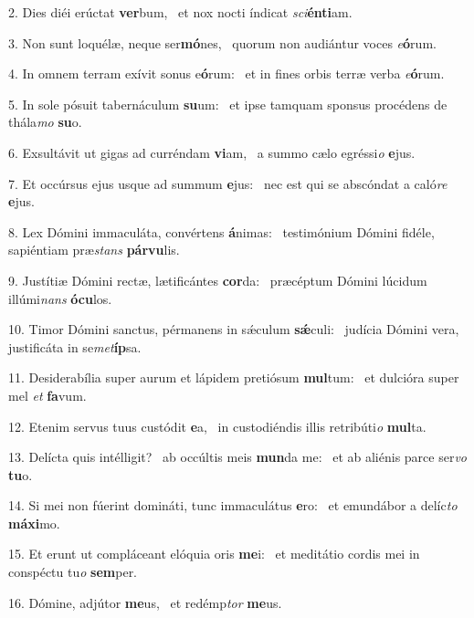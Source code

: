 2. Dies diéi erúctat \textbf{ver}bum, \ast\  et nox nocti índicat \textit{sci}\textbf{én}\textbf{ti}am.\

3. Non sunt loquélæ, neque ser\textbf{mó}nes, \ast\  quorum non audiántur voces \textit{e}\textbf{ó}rum.\

4. In omnem terram exívit sonus e\textbf{ó}rum: \ast\  et in fines orbis terræ verba \textit{e}\textbf{ó}rum.\

5. In sole pósuit tabernáculum \textbf{su}um: \ast\  et ipse tamquam sponsus procédens de thála\textit{mo} \textbf{su}o.\

6. Exsultávit ut gigas ad curréndam \textbf{vi}am, \ast\  a summo cælo egréssi\textit{o} \textbf{e}jus.\

7. Et occúrsus ejus usque ad summum \textbf{e}jus: \ast\  nec est qui se abscóndat a caló\textit{re} \textbf{e}jus.\

8. Lex Dómini immaculáta, convértens \textbf{á}nimas: \ast\  testimónium Dómini fidéle, sapiéntiam præ\textit{stans} \textbf{pár}\textbf{vu}lis.\

9. Justítiæ Dómini rectæ, lætificántes \textbf{cor}da: \ast\  præcéptum Dómini lúcidum illúmi\textit{nans} \textbf{ó}\textbf{cu}los.\

10. Timor Dómini sanctus, pérmanens in sǽculum \textbf{sǽ}culi: \ast\  judícia Dómini vera, justificáta in se\textit{met}\textbf{íp}sa.\

11. Desiderabília super aurum et lápidem pretiósum \textbf{mul}tum: \ast\  et dulcióra super mel \textit{et} \textbf{fa}vum.\

12. Etenim servus tuus custódit \textbf{e}a, \ast\  in custodiéndis illis retribúti\textit{o} \textbf{mul}ta.\

13. Delícta quis intélligit? \dag\  ab occúltis meis \textbf{mun}da me: \ast\  et ab aliénis parce ser\textit{vo} \textbf{tu}o.\

14. Si mei non fúerint domináti, tunc immaculátus \textbf{e}ro: \ast\  et emundábor a delíc\textit{to} \textbf{má}\textbf{xi}mo.\

15. Et erunt ut compláceant elóquia oris \textbf{me}i: \ast\  et meditátio cordis mei in conspéctu tu\textit{o} \textbf{sem}per.\

16. Dómine, adjútor \textbf{me}us, \ast\  et redémp\textit{tor} \textbf{me}us.\


